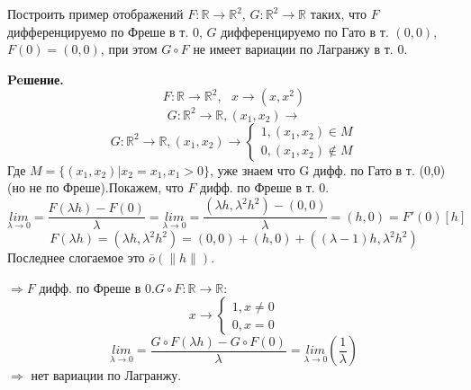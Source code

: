 \begin{task}
    Построить пример отображений $F:\mathbb{R}\rightarrow \mathbb{R}^2$, $G:\mathbb{R}^2\rightarrow \mathbb{R}$ таких, что $F$ дифференцируемо по Фреше в т. $0$, $G$ дифференцируемо по Гато в т. $(0,0)$, $F(0)=(0,0)$, при этом $G \circ F$ не имеет вариации по Лагранжу в т. 0.
    
    \textbf{Peшение.} 
    $$F:\mathbb{R}\rightarrow \mathbb{R}^2, \ \ \ x \rightarrow (x,x^2)$$
    $$G:\mathbb{R}^2\rightarrow \mathbb{R}, (x_1,x_2)\rightarrow$$ 
    \begin{equation*}
    G:\mathbb{R}^2\rightarrow \mathbb{R}, (x_1,x_2)\rightarrow
    \begin{cases}
        1, (x_1,x_2)\in M \\0, (x_1,x_2)\notin M
    \end{cases}
    \end{equation*}
    Где $M=\{ (x_1,x_2)|x_2=x_1,x_1>0\}$, уже знаем что G дифф. по Гато в т. (0,0)(но не по Фреше).Покажем, что $F$ дифф. по Фреше в т. 0.
    $$\underset{\lambda\rightarrow0}{lim}=\frac{F(\lambda h)-F (0)}{\lambda}=\underset{\lambda\rightarrow0}{lim}=\frac{(\lambda h,\lambda^2 h^2)-(0,0)}{\lambda}=(h,0)=F'(0)[h]$$
    $$F(\lambda h)=(\lambda h,\lambda^2 h^2)=(0,0)+(h,0)+((\lambda-1)h,\lambda^2 h^2)$$
    Последнее слогаемое это $\bar{o}(\|h \|)$.
    
    \noindent $\Rightarrow F$ дифф. по Фреше в 0.$G \circ F:\mathbb{R}\rightarrow\mathbb{R}$:
     \begin{equation*}
    x\rightarrow
    \begin{cases}
        1, x\neq0\\0, x=0
    \end{cases}
    \end{equation*}
    $$\underset{\lambda\rightarrow0}{lim}=\frac{G \circ F(\lambda h)-G \circ F(0)}{\lambda}=\underset{\lambda\rightarrow0}{lim} \left( \frac{1}{\lambda} \right) $$
    $\Rightarrow$ нет вариации по Лагранжу.
    \end{task}